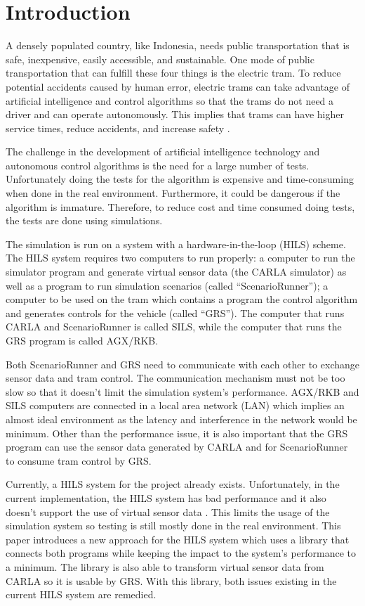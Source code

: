 \section{Introduction}

A densely populated country, like Indonesia, needs public transportation that is
safe, inexpensive, easily accessible, and sustainable. One mode of public
transportation that can fulfill these four things is the electric tram. To
reduce potential accidents caused by human error, electric trams can take
advantage of artificial intelligence and control algorithms so that the trams do
not need a driver and can operate autonomously. This implies that trams can have
higher service times, reduce accidents, and increase safety
\cite{trilaksono_laporanRispro}.

The challenge in the development of artificial intelligence technology and
autonomous control algorithms is the need for a large number of tests.
Unfortunately doing the tests for the algorithm is expensive and time-consuming
when done in the real environment. Furthermore, it could be dangerous if the
algorithm is immature. Therefore, to reduce cost and time consumed doing tests,
the tests are done using simulations.

The simulation is run on a system with a hardware-in-the-loop (HILS) scheme. The
HILS system requires two computers to run properly: a computer to run the
simulator program and generate virtual sensor data (the CARLA simulator) as well
as a program to run simulation scenarios (called ``ScenarioRunner''); a computer
to be used on the tram which contains a program the control algorithm and
generates controls for the vehicle (called ``GRS''). The computer that runs
CARLA and ScenarioRunner is called SILS, while the computer that runs the GRS
program is called AGX/RKB.

Both ScenarioRunner and GRS need to communicate with each other to exchange
sensor data and tram control. The communication mechanism must not be too slow
so that it doesn't limit the simulation system's performance. AGX/RKB and SILS
computers are connected in a local area network (LAN) which implies an almost
ideal environment as the latency and interference in the network would be
minimum. Other than the performance issue, it is also important that the GRS
program can use the sensor data generated by CARLA and for ScenarioRunner to
consume tram control by GRS.

Currently, a HILS system for the project already exists. Unfortunately, in the
current implementation, the HILS system has bad performance and it also doesn't
support the use of virtual sensor data \cite{trilaksono_laporanRispro}. This
limits the usage of the simulation system so testing is still mostly done in the
real environment. This paper introduces a new approach for the HILS system which
uses a library that connects both programs while keeping the impact to the
system's performance to a minimum. The library is also able to transform virtual
sensor data from CARLA so it is usable by GRS.  With this library, both issues
existing in the current HILS system are remedied.
